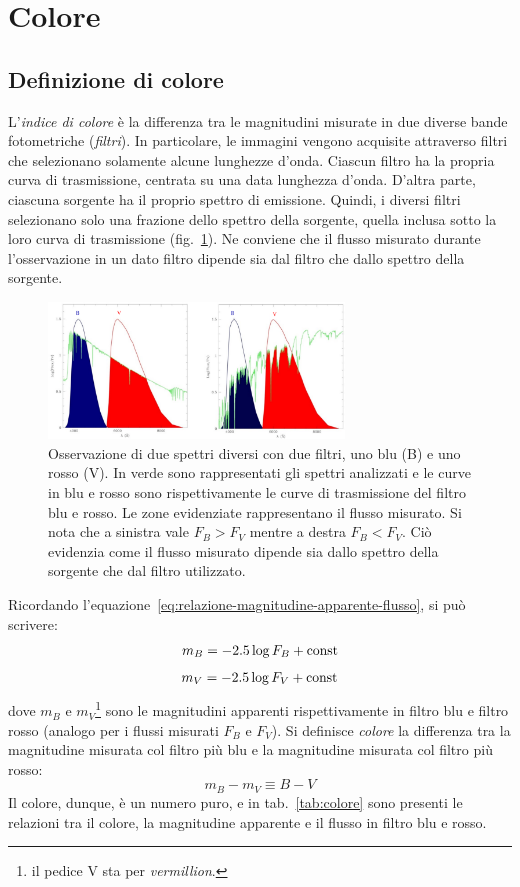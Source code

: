 \section{Colore}\label{sec:colore}
\subsection{Definizione di colore}
L'\emph{indice di colore} è la differenza tra le magnitudini misurate in due diverse bande fotometriche (\emph{filtri}). In particolare, le immagini vengono acquisite attraverso filtri che selezionano solamente alcune lunghezze d'onda. Ciascun filtro ha la propria curva di trasmissione, centrata su una data lunghezza d'onda. D'altra parte, ciascuna sorgente ha il proprio spettro di emissione. Quindi, i diversi filtri selezionano solo una frazione dello spettro della sorgente, quella inclusa sotto la loro curva di trasmissione (fig.~\ref{fig:filtri-fotometrici}). Ne conviene che il flusso misurato durante l'osservazione in un dato filtro dipende sia dal filtro che dallo spettro della sorgente.

\begin{figure}
\centering
\includegraphics[width=0.7\textwidth]{immagini/filtri-fotometrici.png}
\caption{Osservazione di due spettri diversi con due filtri, uno blu (B) e uno rosso (V). In verde sono rappresentati gli spettri analizzati e le curve in blu e rosso sono rispettivamente le curve di trasmissione del filtro blu e rosso. Le zone evidenziate rappresentano il flusso misurato. Si nota che a sinistra vale $F_B > F_V$ mentre a destra $F_B < F_V$. Ciò evidenzia come il flusso misurato dipende sia dallo spettro della sorgente che dal filtro utilizzato.}
\label{fig:filtri-fotometrici}
\end{figure}

Ricordando l'equazione~\eqref{eq:relazione-magnitudine-apparente-flusso}, si può scrivere:
\[
    m_B = -2.5 \log F_B + \textup{const}
\]
\[
    m_V = -2.5 \log F_V + \textup{const}
\]
dove $m_B$ e $m_V$\footnote{il pedice V sta per \emph{vermillion}.} sono le magnitudini apparenti rispettivamente in filtro blu e filtro rosso (analogo per i flussi misurati $F_B$ e $F_V$). Si definisce \emph{colore} la differenza tra la magnitudine misurata col filtro più blu e la magnitudine misurata col filtro più rosso:
\begin{equation}\label{eq:colore}
    m_B - m_V \equiv B-V
\end{equation}
Il colore, dunque, è un numero puro, e in tab.~\ref{tab:colore} sono presenti le relazioni tra il colore, la magnitudine apparente e il flusso in filtro blu e rosso. 

